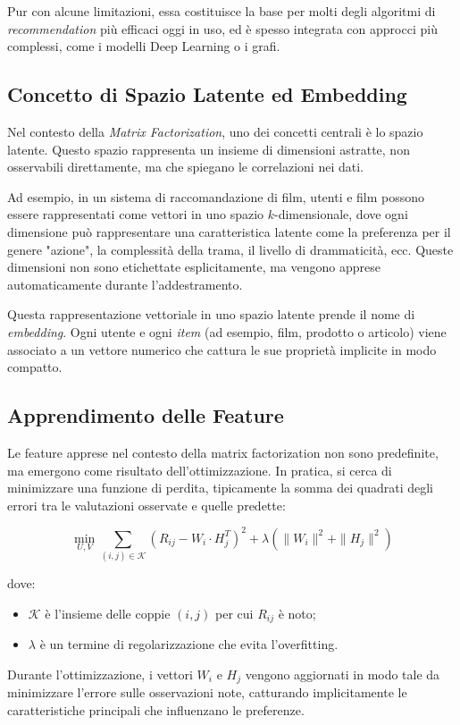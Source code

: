 Pur con alcune limitazioni, essa costituisce la base per molti degli algoritmi di \textit{recommendation} più efficaci oggi in uso, ed è spesso integrata con approcci più complessi, come i modelli Deep Learning o i grafi.

\subsection{Concetto di Spazio Latente ed Embedding}
Nel contesto della \textit{Matrix Factorization}, uno dei concetti centrali è lo spazio latente. Questo spazio rappresenta un insieme di dimensioni astratte, non osservabili direttamente, ma che spiegano le correlazioni nei dati.

Ad esempio, in un sistema di raccomandazione di film, utenti e film possono essere rappresentati come vettori in uno spazio $k$-dimensionale, dove ogni dimensione può rappresentare una caratteristica latente come la preferenza per il genere "azione", la complessità della trama, il livello di drammaticità, ecc. Queste dimensioni non sono etichettate esplicitamente, ma vengono apprese automaticamente durante l'addestramento.

Questa rappresentazione vettoriale in uno spazio latente prende il nome di \textit{embedding}. Ogni utente e ogni \textit{item} (ad esempio, film, prodotto o articolo) viene associato a un vettore numerico che cattura le sue proprietà implicite in modo compatto.

\subsection{Apprendimento delle Feature}
Le feature apprese nel contesto della matrix factorization non sono predefinite, ma emergono come risultato dell'ottimizzazione. In pratica, si cerca di minimizzare una funzione di perdita, tipicamente la somma dei quadrati degli errori tra le valutazioni osservate e quelle predette:

\[
\min_{U,V} \sum_{(i,j) \in \mathcal{K}} (R_{ij} - W_i \cdot H_j^T)^2 + \lambda ( \|W_i\|^2 + \|H_j\|^2 )
\]

dove:
\begin{itemize}
    \item $\mathcal{K}$ è l'insieme delle coppie $(i,j)$ per cui $R_{ij}$ è noto;
    \item $\lambda$ è un termine di regolarizzazione che evita l'overfitting.
\end{itemize}

Durante l'ottimizzazione, i vettori $W_i$ e $H_j$ vengono aggiornati in modo tale da minimizzare l'errore sulle osservazioni note, catturando implicitamente le caratteristiche principali che influenzano le preferenze.

